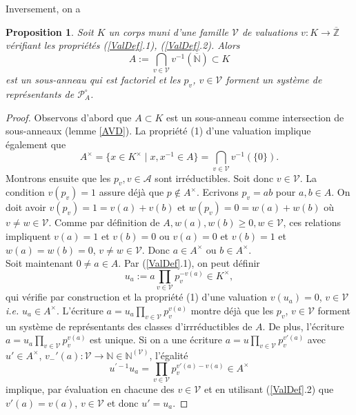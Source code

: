 \documentclass[a4paper, oneside, 12pt]{book}
\newtheorem{proposition}[theoreme]{Proposition}
\theoremstyle{definition} %
\newcommand{\ie}{\textit{i.e.}} %
\newcommand{\Z}{\mathbb{Z}}
\newcommand{\N}{\mathbb{N}}
\begin{document}
Inversement, on a


\begin{proposition}
  Soit $K$ un corps muni d'une famille $\mathcal{V}$ de valuations $v:K\rightarrow \overline{\Z}$ vérifiant les propriétés (\ref{ValDef}.1), (\ref{ValDef}.2). Alors $$A:=\displaystyle{\bigcap_{v\in\mathcal{V}}}v^{-1}(\overline{\N})\subset K$$ est un sous-anneau qui est factoriel et les $p_v$, $v\in\mathcal{V}$ forment un système de représentants de $\mathcal{P}_A^\circ$.
\end{proposition}

\begin{proof}Observons d'abord que  $A\subset K$ est un sous-anneau comme intersection de sous-anneaux (lemme \ref{AVD}). La propriété (1) d'une valuation implique également que $$A^\times=\{ x\in K^\times\;|\; x,x^{-1}\in A\} =\displaystyle{\bigcap_{v\in\mathcal{V}}v^{-1}(\{0\})}.$$  
 Montrons ensuite que les $p_v, v\in\mathcal{A}$ sont irréductibles. Soit donc $v\in \mathcal{V}$. La condition $v(p_v)=1$ assure déjà que $p\notin A^\times$. Ecrivons $p_v=ab$ pour $a,b\in A$. On doit avoir $v(p_v)=1=v(a)+v(b)$ et $w(p_v)=0=w(a)+w(b)$ où $v\not=w\in\mathcal{V}$. Comme par définition de $A, w(a),w(b)\geq 0, w\in\mathcal{V}$, ces relations impliquent $v(a)=1$ et $v(b)=0$ ou $v(a)=0$ et $v(b)=1$ et $w(a)=w(b)=0$, $v\not=w\in\mathcal{V}$. Donc $a\in A^\times$ ou $b\in A^\times$.\\
 Soit maintenant $0\not=a\in A$. Par (\ref{ValDef}.1), on peut définir  $$u_a:=a\prod_{v\in\mathcal{V}}p_v^{-v(a)}\in K^\times,$$
qui vérifie par construction et la propriété (1) d'une valuation $v(u_a)=0$, $v\in\mathcal{V}$ \ie{} $u_a\in A^\times$. L'écriture  $a=u_a\prod_{v\in\mathcal{V}}p_v^{v(a)}$ montre déjà que les $p_v$, $v\in\mathcal{V}$ forment  un système de représentants des classes d'irrréductibles de $A$. De plus, l'écriture $a=u_a\prod_{v\in\mathcal{V}}p_v^{v(a)}$ est unique. Si on a une écriture $a=u\prod_{v\in\mathcal{V}}p_v^{v'(a)}$
avec $u'\in A^\times$, $v_-'(a):\mathcal{V}\rightarrow \N\in\N^{(\mathcal{V})}$, l'égalité
 $$u^{'-1} u_a=\prod_{v\in\mathcal{V}}p_v^{v'(a)-v(a)}\in A^\times$$
implique, par évaluation en chacune des $v\in\mathcal{V}$ et en utilisant (\ref{ValDef}.2) que $v'(a)=v(a)$, $v\in\mathcal{V}$ et donc $u'=u_a$.
\end{proof}
\end{document}
